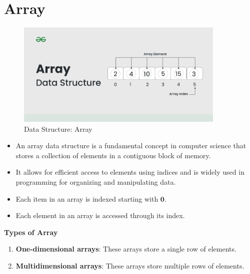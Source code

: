 \section{Array \cite{gfg-array-data-structure-guide}}\label{array}

\begin{table}[h]
    \begin{minipage}{0.35\linewidth}
        \begin{figure}[H]
            \centering
            \includegraphics[width=\linewidth,height=5cm,keepaspectratio]{Pictures/ds-algo/Array-data-structure.png}
            \caption{Data Structure: Array}
        \end{figure}
    \end{minipage}
    \hfill
    \begin{minipage}{0.65\linewidth}
        \begin{itemize}
            \item An array data structure is a fundamental concept in computer science that stores a collection of elements in a contiguous block of memory.

            \item It allows for efficient access to elements using indices and is widely used in programming for organizing and manipulating data.

            \item Each item in an array is indexed starting with $\mathbf{0}$. 
            
            \item Each element in an array is accessed through its index.
        \end{itemize}
    \end{minipage}
\end{table}

\noindent \textbf{Types of Array}
\begin{enumerate}
    \item \textbf{One-dimensional arrays}: These arrays store a single row of elements.
    \item \textbf{Multidimensional arrays}: These arrays store multiple rows of elements.
\end{enumerate}

